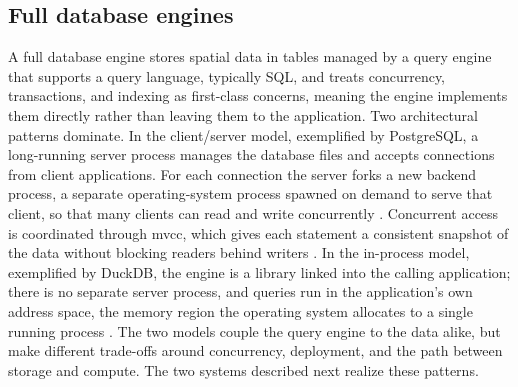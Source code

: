 \subsection{Full database engines}
\label{background:spatial-data-formats-and-storage-models:full-database-engines}
A full database engine stores spatial data in tables managed by a query engine that supports a query language, typically SQL, and treats concurrency, transactions, and indexing as first-class concerns, meaning the engine implements them directly rather than leaving them to the application. Two architectural patterns dominate. In the client/server model, exemplified by PostgreSQL, a long-running server process manages the database files and accepts connections from client applications. For each connection the server forks a new backend process, a separate operating-system process spawned on demand to serve that client, so that many clients can read and write concurrently \parencite{postgresql2024_architectural_fundamentals}. Concurrent access is coordinated through \acrfull{mvcc}, which gives each statement a consistent snapshot of the data without blocking readers behind writers \parencite{postgresql2024_concurrency_control}. In the in-process model, exemplified by DuckDB, the engine is a library linked into the calling application; there is no separate server process, and queries run in the application's own address space, the memory region the operating system allocates to a single running process \parencite{raasveldt2019_duckdb_embeddable_analytical_database}. The two models couple the query engine to the data alike, but make different trade-offs around concurrency, deployment, and the path between storage and compute. The two systems described next realize these patterns.


